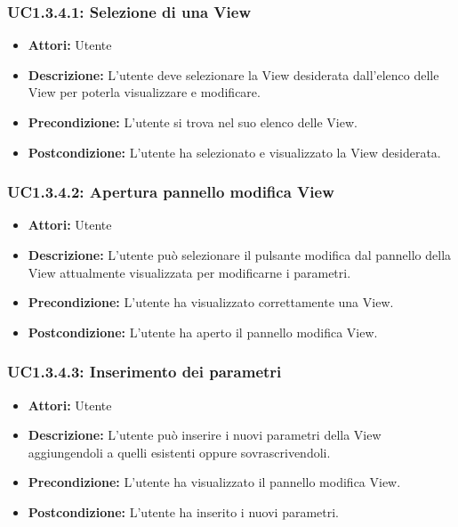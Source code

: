 \subsubsection{UC1.3.4.1: Selezione di una View}

\begin{itemize}
    \item \textbf{Attori:} Utente
    \item \textbf{Descrizione:} L'utente deve selezionare la View desiderata dall'elenco delle View per poterla visualizzare e modificare.
    \item \textbf{Precondizione:} L'utente si trova nel suo elenco delle View.
    \item \textbf{Postcondizione:} L'utente ha selezionato e visualizzato la View desiderata.
\end{itemize}

\subsubsection{UC1.3.4.2: Apertura pannello modifica View}

\begin{itemize}
    \item \textbf{Attori:} Utente
    \item \textbf{Descrizione:} L'utente può selezionare il pulsante modifica dal pannello della View attualmente visualizzata per modificarne i parametri.
    \item \textbf{Precondizione:} L'utente ha visualizzato correttamente una View.
    \item \textbf{Postcondizione:} L'utente ha aperto il pannello modifica View.
\end{itemize}

\subsubsection{UC1.3.4.3: Inserimento dei parametri}

\begin{itemize}
    \item \textbf{Attori:} Utente
    \item \textbf{Descrizione:} L'utente può inserire i nuovi parametri della View aggiungendoli a quelli esistenti oppure sovrascrivendoli.
    \item \textbf{Precondizione:} L'utente ha visualizzato il pannello modifica View.
    \item \textbf{Postcondizione:} L'utente ha inserito i nuovi parametri.
\end{itemize}

